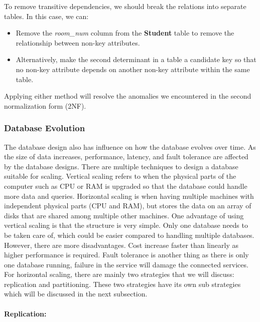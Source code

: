 To remove transitive dependencies, we should break the relations into separate tables. In this case, we can:

\begin{itemize}
    \item Remove the \textit{room\_num} column from the \textbf{Student} table to remove the relationship between non-key attributes.
    \item Alternatively, make the second determinant in a table a candidate key so that no non-key attribute depends on another non-key attribute within the same table.
\end{itemize}

Applying either method will resolve the anomalies we encountered in the second normalization form (2NF).




\subsubsection[Database Evolution]{Database Evolution}

The database design also has influence on how the database evolves over time. As the size of data increases, performance, latency, and fault tolerance are affected by the database designs. There are multiple techniques to design a database suitable for scaling. Vertical scaling refers to when the physical parts of the computer such as CPU or RAM is upgraded so that the database could handle more data and queries. Horizontal scaling is when having multiple machines with independent physical parts (CPU and RAM), but stores the data on an array of disks that are shared among multiple other machines. 
One advantage of using vertical scaling is that the structure is very simple. Only one database needs to be taken care of, which could be easier compared to handling multiple databases. However, there are more disadvantages. Cost increase faster than linearly as higher performance is required. Fault tolerance is another thing as there is only one database running, failure in the service will damage the connected services. 
For horizontal scaling, there are mainly two strategies that we will discuss: replication and partitioning. These two strategies have its own sub strategies which will be discussed in the next subsection.

\paragraph{Replication:}


